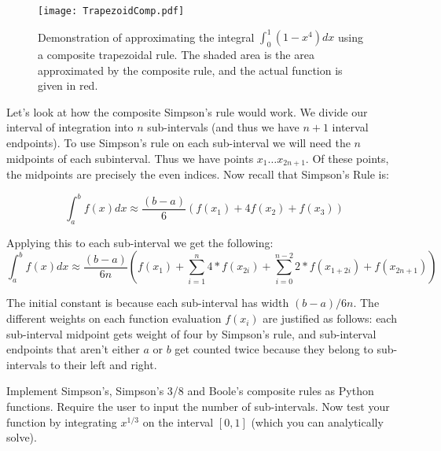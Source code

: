 \begin{figure}
\begin{center}
\texttt{[image: TrapezoidComp.pdf]}
\caption{Demonstration of approximating the integral $\int_0^1 (1-x^4)dx$ using a composite trapezoidal rule.
The shaded area is the area approximated by the composite rule, and the actual function is given in red.}
\label{Fig:TrapezoidalComposite}
\end{center}
\end{figure}

Let's look at how the composite Simpson's rule would work.
We divide our interval of integration into $n$ sub-intervals (and thus we have $n+1$ interval endpoints).
To use Simpson's rule on each sub-interval we will need the $n$ midpoints of each subinterval.
Thus we have points $x_1 \ldots x_{2n+1}$.
Of these points, the midpoints are precisely the even indices.
Now recall that Simpson's Rule is:

\[
\int_a^b f(x) dx \approx \frac{(b-a)}{6}\left(f(x_1) + 4 f(x_2) + f(x_3)\right)
\]

Applying this to each sub-interval we get the following:
\[
\int_a^b f(x) dx \approx \frac{(b-a)}{6n}\left( f(x_1) + \sum_{i=1}^{n} 4*f(x_{2i}) + \sum_{i=0}^{n-2} 2*f(x_{1+2i}) + f(x_{2n+1})\right)
\]

The initial constant is because each sub-interval has width $(b-a)/6n$.
The different weights on each function evaluation $f(x_i)$ are justified as follows: each sub-interval midpoint gets weight of four by Simpson's rule, and sub-interval endpoints that aren't either $a$ or $b$ get counted twice because they belong to sub-intervals to their left and right.

\begin{problem}
Implement Simpson's, Simpson's 3/8 and Boole's composite rules as Python functions.
Require the user to input the number of sub-intervals.
Now test your function by integrating $x^{1/3}$ on the interval $[0,1]$ (which you can analytically solve).
\end{problem}

